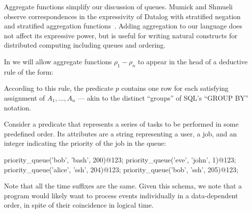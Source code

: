Aggregate functions simplify our discussion of queues.  Mumick and Shmueli observe correspondences in the expressivity of Datalog with stratified negation and stratified aggregation functions~\cite{mumickshmueli}.  Adding aggregation to our language does not affect its expressive power, but is useful for writing natural constructs for distributed computing including queues and ordering.  

In \slang we will allow
aggregate functions $\rho_1 - \rho_n$ to appear
in the head of a deductive rule of the form:

\linebreak{}

According to this rule, the predicate $p$ contains one row for each satisfying assignment of $A_1, \ldots, A_n$ --- akin to the distinct ``groups'' of SQL's ``GROUP BY'' notation.



Consider a predicate  that represents a series of tasks to be performed in some predefined order.  Its attributes are a string representing a user, a job, and an integer
indicating the priority of the job in the queue:

\begin{Dedalus}
priority\_queue('bob', 'bash', 200)@123;
priority\_queue('eve', 'john', 1)@123;
priority\_queue('alice', 'ssh', 204)@123;
priority\_queue('bob', 'ssh', 205)@123;
\end{Dedalus}

Note that all the time suffixes are the same.  
Given this schema, we note that a program would likely want to process
 events individually in a data-dependent order, in
spite of their coincidence in logical time.  


